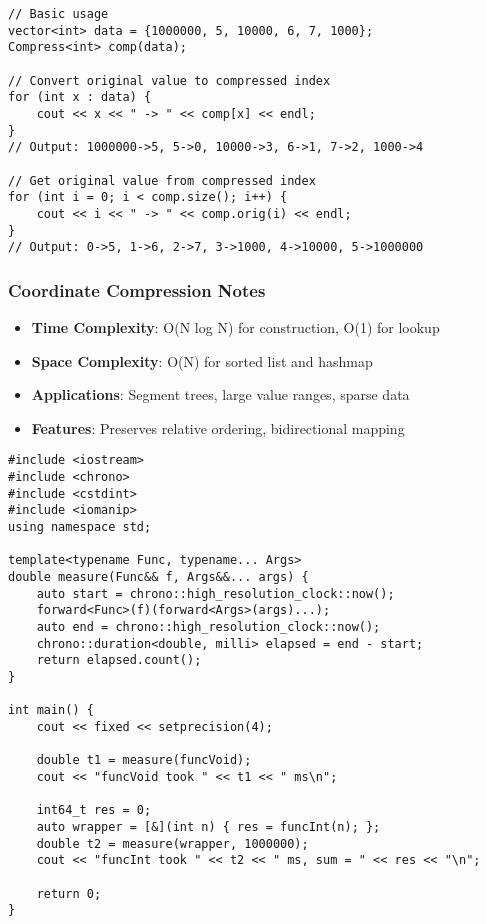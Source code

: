 \documentclass[11pt,a4paper]{article}
\begin{document}
\begin{lstlisting}[caption={Coordinate Compression Example}]
// Basic usage
vector<int> data = {1000000, 5, 10000, 6, 7, 1000};
Compress<int> comp(data);

// Convert original value to compressed index
for (int x : data) {
    cout << x << " -> " << comp[x] << endl;
}
// Output: 1000000->5, 5->0, 10000->3, 6->1, 7->2, 1000->4

// Get original value from compressed index
for (int i = 0; i < comp.size(); i++) {
    cout << i << " -> " << comp.orig(i) << endl;
}
// Output: 0->5, 1->6, 2->7, 3->1000, 4->10000, 5->1000000
\end{lstlisting}

\subsubsection{Coordinate Compression Notes}
\begin{itemize}
\item \textbf{Time Complexity}: O(N log N) for construction, O(1) for lookup
\item \textbf{Space Complexity}: O(N) for sorted list and hashmap
\item \textbf{Applications}: Segment trees, large value ranges, sparse data
\item \textbf{Features}: Preserves relative ordering, bidirectional mapping
\end{itemize}

\newpage
\begin{lstlisting}[caption={Measure Time Utility}]
#include <iostream>
#include <chrono>
#include <cstdint>
#include <iomanip>  
using namespace std;

template<typename Func, typename... Args>
double measure(Func&& f, Args&&... args) {
    auto start = chrono::high_resolution_clock::now();
    forward<Func>(f)(forward<Args>(args)...);
    auto end = chrono::high_resolution_clock::now();
    chrono::duration<double, milli> elapsed = end - start;
    return elapsed.count();
}

int main() {
    cout << fixed << setprecision(4);

    double t1 = measure(funcVoid);
    cout << "funcVoid took " << t1 << " ms\n";

    int64_t res = 0;
    auto wrapper = [&](int n) { res = funcInt(n); };
    double t2 = measure(wrapper, 1000000);
    cout << "funcInt took " << t2 << " ms, sum = " << res << "\n";

    return 0;
}
\end{lstlisting}
\end{document}
